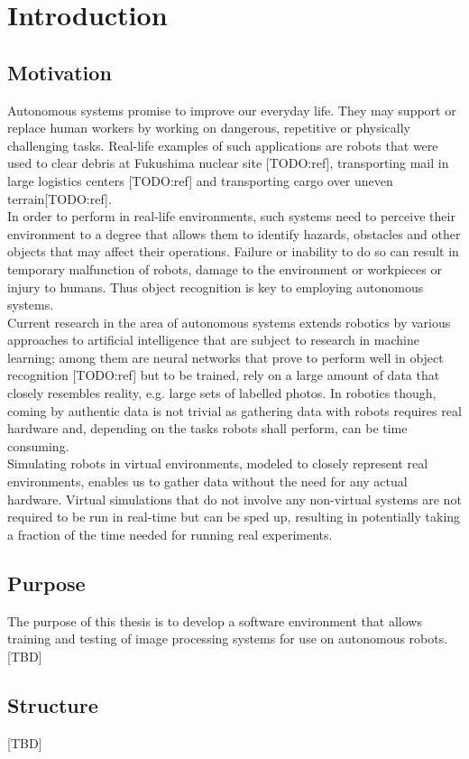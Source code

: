 \chapter{Introduction}

\section{Motivation}
Autonomous systems promise to improve our everyday life. They may support or replace human workers by working on dangerous, repetitive or physically challenging tasks. Real-life examples of such applications are robots that were used to clear debris at Fukushima nuclear site [TODO:ref], transporting mail in large logistics centers [TODO:ref] and transporting cargo over uneven terrain[TODO:ref].\\
In order to perform in real-life environments, such systems need to perceive their environment to a degree that allows them to identify hazards, obstacles and other objects that may affect their operations. Failure or inability to do so can result in temporary malfunction of robots, damage to the environment or workpieces or injury to humans. Thus object recognition is key to employing autonomous systems.\\
Current research in the area of autonomous systems extends robotics by various approaches to artificial intelligence that are subject to research in machine learning; among them are neural networks that prove to perform well in object recognition [TODO:ref] but to be trained, rely on a large amount of data that closely resembles reality, e.g. large sets of labelled photos. In robotics though, coming by authentic data is not trivial as gathering data with robots requires real hardware and, depending on the tasks robots shall perform, can be time consuming.\\
Simulating robots in virtual environments, modeled to closely represent real environments, enables us to gather data without the need for any actual hardware. Virtual simulations that do not involve any non-virtual systems are not required to be run in real-time but can be sped up, resulting in potentially taking a fraction of the time needed for running real experiments.

\section{Purpose}
The purpose of this thesis is to develop a software environment that allows training and testing of image processing systems for use on autonomous robots.
[TBD]

\section{Structure}
[TBD]